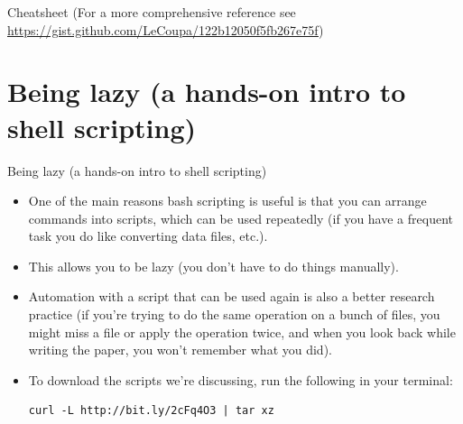 \documentclass{beamer}
\begin{document}
\begin{frame}{Cheatsheet}
\centering
{}
(For a more comprehensive reference see {\color{blue} \url{https://gist.github.com/LeCoupa/122b12050f5fb267e75f}})
\end{frame}

\section{Being lazy (a hands-on intro to shell scripting)}
\begin{frame}[fragile]{Being lazy (a hands-on intro to shell scripting)}
\begin{itemize}
\item<1-> One of the main reasons bash scripting is useful is that you can arrange commands into scripts, which can be used repeatedly (if you have a frequent task you do like converting data files, etc.). 
\item<2-> This allows you to be lazy (you don't have to do things manually).
\item<3-> Automation with a script that can be used again is also a better research practice (if you're trying to do the same operation on a bunch of files, you might miss a file or apply the operation twice, and when you look back while writing the paper, you won't remember what you did).
\item<4-> To download the scripts we're discussing, run the following in your terminal:  
\begin{lstlisting}
curl -L http://bit.ly/2cFq4O3 | tar xz
\end{lstlisting}
\end{itemize}
\end{frame}
\end{document}
